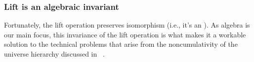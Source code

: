 \subsubsection{Lift is an algebraic invariant}\label{lift-is-an-algebraic-invariant}

Fortunately, the lift operation preserves isomorphism (i.e., it's an ). As algebra is our main focus, this invariance of the lift operation is what makes it a workable solution to the technical problems that arise from the noncumulativity of the universe hierarchy discussed in \ualibLifts~\cite[\S2.5]{DeMeo:2021-1}.
\ccpad
\begin{code}%
\>[0]\AgdaSpace{}%
\<%
\\
%
\\[\AgdaEmptyExtraSkip]%
\>[0]\AgdaSpace{}%
\AgdaSymbol{:}\AgdaSpace{}%
\AgdaSymbol{\{}\AgdaSpace{}%
\AgdaSpace{}%
\AgdaSymbol{:}\AgdaSpace{}%
\AgdaSymbol{\}\{}\AgdaSpace{}%
\AgdaSymbol{:}\AgdaSpace{}%
\AgdaSpace{}%
\AgdaSpace{}%
\AgdaSymbol{\}}\AgdaSpace{}%
\AgdaSpace{}%
\AgdaSpace{}%
\AgdaSpace{}%
\AgdaSymbol{(}\AgdaSpace{}%
\AgdaSpace{}%
\AgdaSymbol{)}\<%
\\
%
\\[\AgdaEmptyExtraSkip]%
\>[0]\AgdaSpace{}%
\AgdaSymbol{=}\AgdaSpace{}%
\AgdaSymbol{(}\AgdaSpace{}%
\AgdaOperator{\AgdaInductiveConstructor{,}}\AgdaSpace{}%
\AgdaSpace{}%
\AgdaBound{\AgdaUnderscore{}}\AgdaSpace{}%
\AgdaBound{\AgdaUnderscore{}}\AgdaSpace{}%
\AgdaSpace{}%
\AgdaSymbol{)}\AgdaOperator{\AgdaInductiveConstructor{,}}\AgdaSpace{}%
\AgdaSymbol{(}\AgdaSpace{}%
\AgdaOperator{\AgdaInductiveConstructor{,}}\AgdaSpace{}%
\AgdaSpace{}%
\AgdaBound{\AgdaUnderscore{}}\AgdaSpace{}%
\AgdaBound{\AgdaUnderscore{}}\AgdaSpace{}%
\AgdaSpace{}%
\AgdaSymbol{)}\AgdaOperator{\AgdaInductiveConstructor{,}}\AgdaSpace{}%
\AgdaSpace{}%
\AgdaBound{\AgdaUnderscore{}}\AgdaSpace{}%
\AgdaSpace{}%
\AgdaSymbol{)}\AgdaOperator{\AgdaInductiveConstructor{,}}\AgdaSpace{}%
\AgdaSpace{}%
\AgdaBound{\AgdaUnderscore{}}\AgdaSpace{}%
\AgdaSpace{}%

\end{code}
